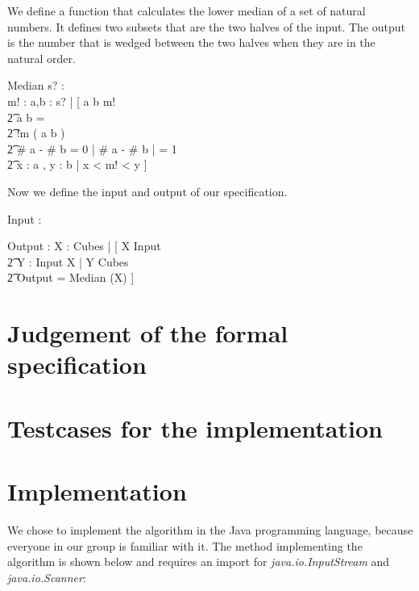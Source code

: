 \documentclass[12pt]{article}
\begin{document}
We define a function that calculates the lower median of a set of natural numbers. It defines two subsets that are the two halves of the input. The output is the number that is wedged between the two halves when they are in the natural order.
\begin{schema}{Median}
s? : \power \nat \\
m! : \nat
\where
\exists a,b : \power s? | [ \: a \union b \union m! \\
                          \t2 a \cap b = \empty \\
                          \t2 !m \notin ( a \union b ) \\
                          \t2 \# a - \# b = 0 \: \vee | \# a - \# b | = 1 \\
                          \t2 \forall x : a , y : b | x < m! < y \: ]
\end{schema}

Now we define the input and output of our specification.
\begin{axdef}
Input : \seq \nat
\end{axdef}

\begin{axdef}
Output : \nat
\where
\exists X : Cubes | [ \: X \subseteq \ran Input \\ \t2 \forall Y : \ran Input \setminus X | Y \not\subseteq Cubes \\ \t2 Output = Median (X) \: ]
\end{axdef}

\section{Judgement of the formal specification}

\section{Testcases for the implementation}

\section{Implementation}
We chose to implement the algorithm in the Java programming language, because everyone in our group is familiar with it. The method implementing the algorithm is shown below and requires an import for \textsl{java.io.InputStream} and \textsl{java.io.Scanner}:
\end{document}
